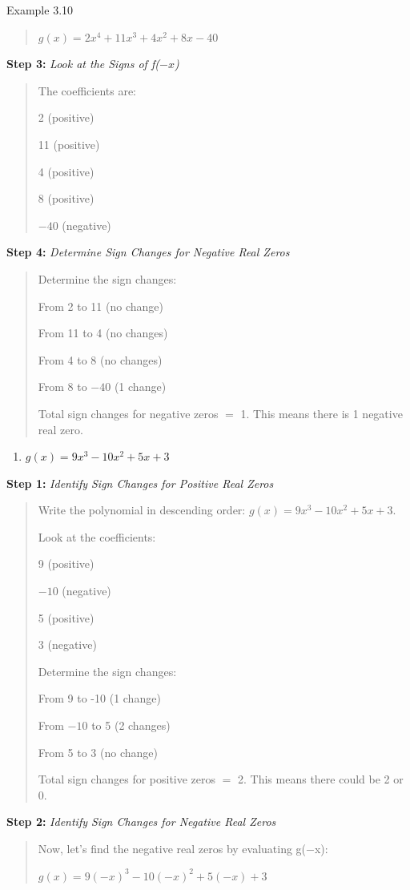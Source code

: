 \begin{example}{Example 3.10}
\begin{quote}
$g(x) = 2x^4 + 11x^3 + 4x^2 + 8x - 40$
\end{quote}
\textbf{Step 3:} \textit{Look at the Signs of f($-x$)}
\begin{quote}
The coefficients are:

2 (positive)

11 (positive)

4 (positive)

8 (positive)

$-40$ (negative)
\end{quote}
\textbf{Step 4:} \textit{Determine Sign Changes for Negative Real Zeros}
\begin{quote}
Determine the sign changes:

From 2 to 11 (no change)

From 11 to 4 (no changes)

From 4 to 8 (no changes)

From 8 to $-40$ (1 change)

Total sign changes for negative zeros $=$ 1. This means there is 1 negative
real zero.
\end{quote}
\begin{enumerate}
  \item[b.] $g(x) = 9x^3 - 10x^2 + 5x + 3$
\end{enumerate}
\textbf{Step 1:} \textit{Identify Sign Changes for Positive Real Zeros}
\begin{quote}
Write the polynomial in descending order: $g(x) = 9x^3 - 10x^2 + 5x + 3$.

Look at the coefficients:

9 (positive)

$-10$ (negative)

5 (positive)

3 (negative)

Determine the sign changes:

From 9 to -10 (1 change)

From $-10$ to 5 (2 changes)

From 5 to 3 (no change)

Total sign changes for positive zeros $=$ 2. This means there could be 2 or 0.
\end{quote}
\textbf{Step 2:} \textit{Identify Sign Changes for Negative Real Zeros}
\begin{quote}
Now, let's find the negative real zeros by evaluating g($-$x):

$g(x) = 9(-x)^3 - 10(-x)^2 + 5(-x) + 3$


\end{quote}
\end{example}
